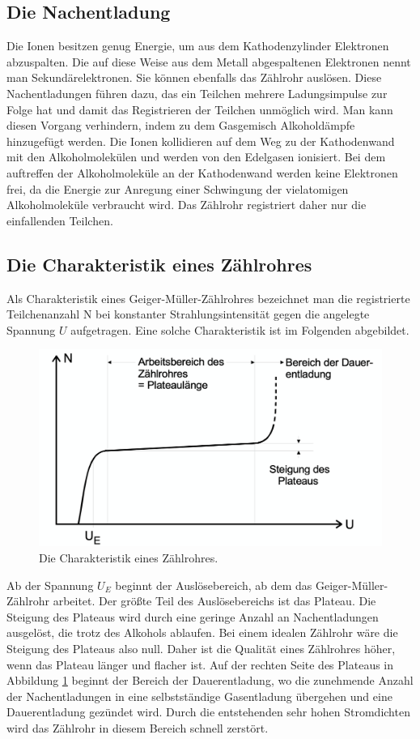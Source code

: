   \subsection{Die Nachentladung}
    Die Ionen besitzen genug Energie, um aus dem Kathodenzylinder Elektronen abzuspalten. Die auf
    diese Weise aus dem Metall abgespaltenen Elektronen nennt man Sekundärelektronen. Sie können
    ebenfalls das Zählrohr auslösen. Diese Nachentladungen führen dazu, das ein Teilchen mehrere
    Ladungsimpulse zur Folge hat und damit das Registrieren der Teilchen unmöglich wird. Man kann
    diesen Vorgang verhindern, indem zu dem Gasgemisch Alkoholdämpfe hinzugefügt werden. Die Ionen
    kollidieren auf dem Weg zu der Kathodenwand mit den Alkoholmolekülen und werden von den Edelgasen
    ionisiert. Bei dem auftreffen der Alkoholmoleküle an der Kathodenwand werden keine Elektronen
    frei, da die Energie zur Anregung einer Schwingung der vielatomigen Alkoholmoleküle verbraucht
    wird. Das Zählrohr registriert daher nur die einfallenden Teilchen.
  \subsection{Die Charakteristik eines Zählrohres}
    Als Charakteristik eines Geiger-Müller-Zählrohres bezeichnet man die registrierte Teilchenanzahl N
    bei konstanter Strahlungsintensität gegen die angelegte Spannung $U$ aufgetragen. Eine solche
    Charakteristik ist im Folgenden abgebildet.
    \begin{figure}[H]
      \centering
      \includegraphics[scale=0.6]{content/Charakteristik}
      \caption{Die Charakteristik eines Zählrohres.}
      \label{fig:charakteristik1}
    \end{figure}
    \noindent
    Ab der Spannung $U_{E}$ beginnt der Auslösebereich, ab dem das Geiger-Müller-Zählrohr arbeitet.
    Der größte Teil des Auslösebereichs ist das Plateau. Die Steigung des Plateaus wird durch eine
    geringe Anzahl an Nachentladungen ausgelöst, die trotz des Alkohols ablaufen. Bei einem idealen
    Zählrohr wäre die Steigung des Plateaus also null. Daher ist die Qualität eines Zählrohres höher,
    wenn das Plateau länger und flacher ist. Auf der rechten Seite des Plateaus in Abbildung
    \ref{fig:charakteristik1} beginnt der Bereich der Dauerentladung, wo die zunehmende Anzahl der
    Nachentladungen in eine selbstständige Gasentladung übergehen und eine Dauerentladung gezündet
    wird. Durch die entstehenden sehr hohen Stromdichten wird das Zählrohr in diesem Bereich schnell
    zerstört.
\label{sec:Theorie}

